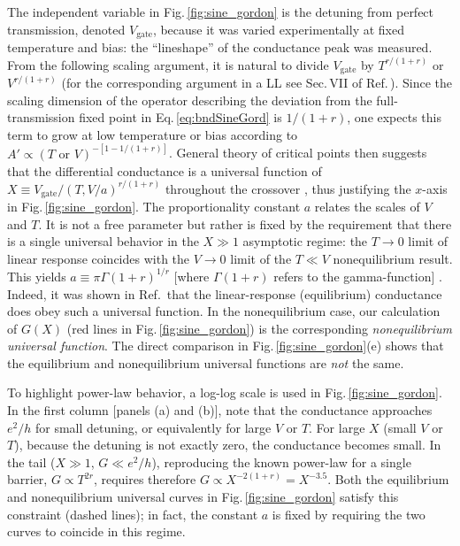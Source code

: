 \documentclass[aps,prb,reprint,floatfix,superscriptaddress,amssymb,amsmath]{revtex4-2}
\newcommand{\Vg}{V_\text{gate}}
\begin{document}
The independent variable in Fig.\,\ref{fig:sine_gordon} is the detuning from perfect transmission, denoted $\Vg$, because it was varied experimentally at fixed temperature and bias: the ``lineshape'' of the conductance peak was measured.  From the following scaling argument, it is natural to divide $\Vg$ by $T^{r/(1+r)}$ or $V^{r/(1+r)}$
(for the corresponding argument in a LL see Sec.\,VII of Ref.\,\cite{KaneFisherPRB92}).  Since the scaling dimension of the operator describing the deviation from the full-transmission fixed point in Eq.\,\eqref{eq:bndSineGord} is $1/(1+r)$, one expects this term to grow at low temperature or bias according to $A' \!\propto\! (T\text{ or }V)^{-[1-1/(1+r)]}$. 
General theory of critical points then suggests that the differential conductance is a universal function of $X \!\equiv\! \Vg  / (T,V/a)^{r/(1+r)}$ throughout the crossover \cite{KaneFisherPRB92}, thus justifying the $x$-axis in Fig.\,\ref{fig:sine_gordon}.  
The proportionality constant $a$ relates
the scales of $V$ and $T$. It is not a free parameter but rather is fixed by the requirement that there is a single universal behavior in the $X\!\gg\!1$ asymptotic regime: the $T\!\to\!0$ limit of linear response coincides with the $V\!\to\!0$ limit of the $T\!\ll\!V$ nonequilibrium result.  This yields 
$a \!\equiv\! \pi\Gamma(1 + r)^{1/r}$ [where $\Gamma(1 + r)$ refers to the gamma-function] \cite{KaneFisherPRB92}. 
Indeed, it was shown in Ref.\,\cite{Mebrahtu13} that the linear-response (equilibrium) conductance does obey such a universal function. 
In the nonequilibrium case, our calculation of $G(X)$ (red lines in Fig.\,\ref{fig:sine_gordon}) is the corresponding \emph{nonequilibrium universal function}. 
The direct comparison in Fig.\,\ref{fig:sine_gordon}(e) shows that the equilibrium and nonequilibrium universal functions are \emph{not} the same. 

To highlight power-law behavior, a log-log scale is used in Fig.\,\ref{fig:sine_gordon}. 
In the first column [panels (a) and (b)], note that the conductance approaches $e^2/h$ for small detuning, or equivalently for large $V$ or $T$. 
For large $X$ (small $V$ or $T$), because the detuning is not exactly zero, the conductance becomes small. In the tail ($X\!\gg\!1$, $G\!\ll\! e^2/h$), reproducing the known power-law for a single barrier, $G \!\propto\! T^{2r}$, requires therefore 
$G \!\propto\! X^{-2(1+r)} \!=\!X^{-3.5}$. 
Both the equilibrium and nonequilibrium universal curves in Fig.\,\ref{fig:sine_gordon} satisfy this constraint (dashed lines); in fact, the constant $a$ is fixed by requiring the two curves to coincide in this regime. 
\end{document}
